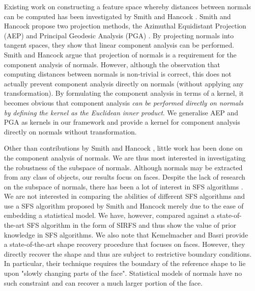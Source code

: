 Existing work on constructing a feature space whereby distances between normals can be computed has been investigated by Smith and Hancock \cite{RefWorks:90,RefWorks:86}. Smith and Hancock propose two projection methods, the Azimuthal Equidistant Projection (AEP) \cite{RefWorks:102} and Principal Geodesic Analysis (PGA) \cite{RefWorks:100,RefWorks:101}. By projecting normals into tangent spaces, they show that linear component analysis can be performed. Smith and Hancock argue that projection of normals is a requirement for the component analysis of normals. However, although the observation that computing distances between normals is non-trivial is correct, this does not actually prevent component analysis directly on normals (\ie without applying any transformation). By formulating the component analysis in terms of a kernel, it becomes obvious that component analysis \textit{can be performed directly on normals by defining the kernel as the Euclidean inner product}. We generalise AEP and PGA as kernels in our framework and provide a kernel for component analysis directly on normals without transformation.

Other than contributions by Smith and Hancock \cite{RefWorks:90,RefWorks:86}, little work has been done on the component analysis of normals. We are thus most interested in investigating the robustness of the subspace of normals. Although normals may be extracted from any class of objects, our results focus on faces. Despite the lack of research on the subspace of normals, there has been a lot of interest in SFS algorithms \cite{RefWorks:230}. We are not interested in comparing the abilities of different SFS algorithms and use a SFS algorithm proposed by Smith and Hancock merely due to the ease of embedding a statistical model. We have, however, compared against a state-of-the-art SFS algorithm in the form of SIRFS \cite{RefWorks:225} and thus show the value of prior knowledge in SFS algorithms. We also note that Kemelmacher and Basri \cite{RefWorks:226} provide a state-of-the-art shape recovery procedure that focuses on faces. However, they directly recover the shape and thus are subject to restrictive boundary conditions. In particular, their technique requires the boundary of the reference shape to lie upon "slowly changing parts of the face". Statistical models of normals have no such constraint and can recover a much larger portion of the face.

